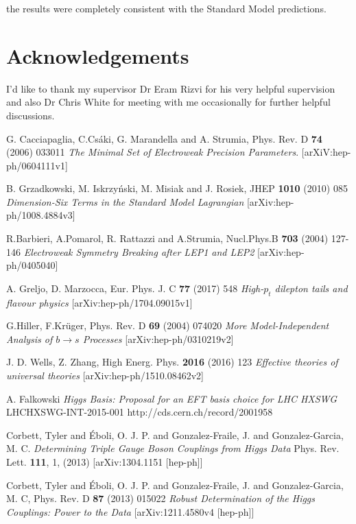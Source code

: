 \documentclass[11pt,oneside,a4paper]{article}
\begin{document}
the results were completely consistent with the Standard Model predictions. 


\section{Acknowledgements}
I'd like to thank my supervisor Dr Eram Rizvi for his very helpful supervision and also Dr Chris White for meeting with me occasionally for further helpful discussions.


\begin{thebibliography}{9} 
G. Cacciapaglia, C.Csáki, G. Marandella and A. Strumia, Phys. Rev. D \textbf{74} (2006) 033011
\textit{The Minimal Set of Electroweak Precision Parameters}. 
[arXiV:hep-ph/0604111v1]

B. Grzadkowski, M. Iskrzyński, M. Misiak and J. Rosiek, JHEP \textbf{1010} (2010) 085 
\textit{Dimension-Six Terms in the Standard Model Lagrangian} 
[arXiv:hep-ph/1008.4884v3]	

R.Barbieri, A.Pomarol, R. Rattazzi and A.Strumia, Nucl.Phys.B \textbf{703} (2004) 127-146
\textit{Electroweak Symmetry Breaking after LEP1 and LEP2}
[arXiv:hep-ph/0405040]

A. Greljo, D. Marzocca, Eur. Phys. J. C \textbf{77} (2017) 548
\textit{High-$p_{t}$ dilepton tails and flavour physics}
[arXiv:hep-ph/1704.09015v1]

G.Hiller, F.Kr\"uger, Phys. Rev. D \textbf{69} (2004) 074020
\textit{More Model-Independent Analysis of $b \rightarrow s$ Processes}
[arXiv:hep-ph/0310219v2]

J. D. Wells, Z. Zhang, High Energ. Phys. \textbf{2016} (2016) 123
\textit{Effective theories of universal theories}
[arXiv:hep-ph/1510.08462v2] 

A. Falkowski
\textit{Higgs Basis: Proposal for an EFT basis choice for LHC HXSWG}
LHCHXSWG-INT-2015-001
http://cds.cern.ch/record/2001958

Corbett, Tyler and \'Eboli, O. J. P. and Gonzalez-Fraile, J. and Gonzalez-Garcia, M. C.
\textit{Determining Triple Gauge Boson Couplings from Higgs Data}
Phys. Rev. Lett. \textbf{111}, 1, (2013) [arXiv:1304.1151 [hep-ph]]

Corbett, Tyler and \'Eboli, O. J. P. and Gonzalez-Fraile, J. and Gonzalez-Garcia, M. C, Phys. Rev. D \textbf{87} (2013) 015022 
\textit{Robust Determination of the Higgs Couplings: Power to the Data}
[arXiv:1211.4580v4 [hep-ph]]



\end{thebibliography}
\end{document}
